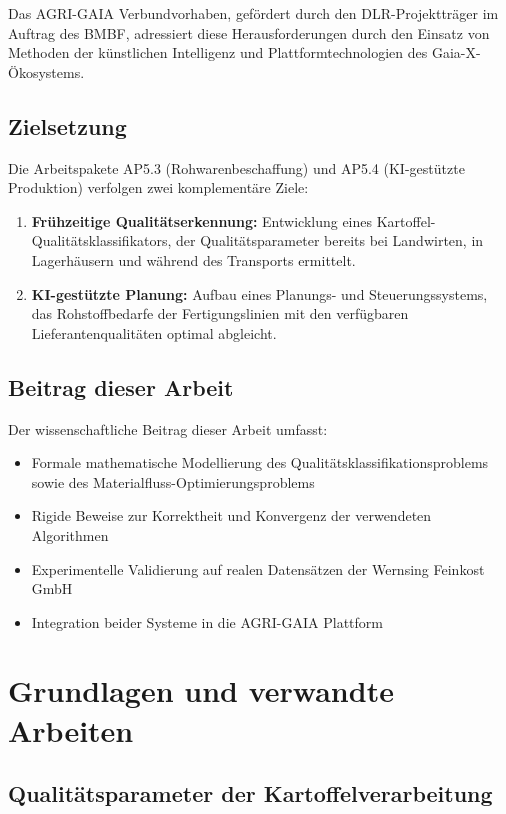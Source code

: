 \documentclass[a4paper, 12pt, twoside, openright]{report}
\theoremstyle{definition}
\theoremstyle{definition}
\begin{document}
Das AGRI-GAIA Verbundvorhaben, gefördert durch den DLR-Projektträger im
Auftrag des BMBF, adressiert diese Herausforderungen durch den Einsatz
von Methoden der künstlichen Intelligenz und Plattformtechnologien des
Gaia-X-Ökosystems.

\subsection{Zielsetzung}

Die Arbeitspakete AP5.3 (Rohwarenbeschaffung) und AP5.4
(KI-gestützte Produktion) verfolgen zwei komplementäre Ziele:

\begin{enumerate}[label=\textbf{Z\arabic*.}]
	\item \textbf{Frühzeitige Qualitätserkennung:} Entwicklung eines
	Kartoffel-Qualitätsklassifika\-tors, der Qualitätsparameter bereits
	bei Landwirten, in Lagerhäusern und während des Transports ermittelt.
	\item \textbf{KI-gestützte Planung:} Aufbau eines Planungs- und
	Steuerungssystems, das Rohstoffbedarfe der Fertigungslinien mit den
	verfügbaren Lieferantenqualitäten optimal abgleicht.
\end{enumerate}

\subsection{Beitrag dieser Arbeit}

Der wissenschaftliche Beitrag dieser Arbeit umfasst:
\begin{itemize}
	\item Formale mathematische Modellierung des Qualitätsklassifikationsproblems
	sowie des Materialfluss-Optimierungsproblems
	\item Rigide Beweise zur Korrektheit und Konvergenz der verwendeten Algorithmen
	\item Experimentelle Validierung auf realen Datensätzen der
	Wernsing Feinkost GmbH
	\item Integration beider Systeme in die AGRI-GAIA Plattform
\end{itemize}


\section{Grundlagen und verwandte Arbeiten}


\subsection{Qualitätsparameter der Kartoffelverarbeitung}
\end{document}
